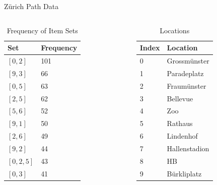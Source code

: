 \documentclass{beamer}
\begin{document}
\begin{frame}{Zürich Path Data}
  \begin{columns}
    \begin{column}{0.5\columnwidth}
      \begin{table}
        \centering
        \caption{Frequency of Item Sets}
        \begin{tabular}{ll}
          \hline
          Set & Frequency \\
          \hline
          $[0, 2]$ & 101 \\
          $[9, 3]$ & 66 \\
          $[0, 5]$ & 63 \\
          $[2, 5]$ & 62 \\
          $[5, 6]$ & 52 \\
          $[9, 1]$ & 50 \\
          $[2, 6]$ & 49 \\
          $[9, 2]$ & 44 \\
          $[0, 2, 5]$ & 43 \\
          $[0, 3]$ & 41 \\
          \hline
        \end{tabular}
      \end{table}
    \end{column}
    
    \begin{column}{0.5\columnwidth}
      \begin{table}
        \centering
        \caption{Locations}
        \begin{tabular}{ll}
          \hline
          Index & Location \\
          \hline
          0 & Grossmünster \\
          1 & Paradeplatz \\
          2 & Fraumünster \\
          3 & Bellevue \\
          4 & Zoo \\
          5 & Rathaus \\
          6 & Lindenhof \\
          7 & Hallenstadion \\
          8 & HB \\
          9 & Bürkliplatz \\
          \hline
        \end{tabular}
      \end{table}
    \end{column}
  \end{columns}
\end{frame}
\end{document}
